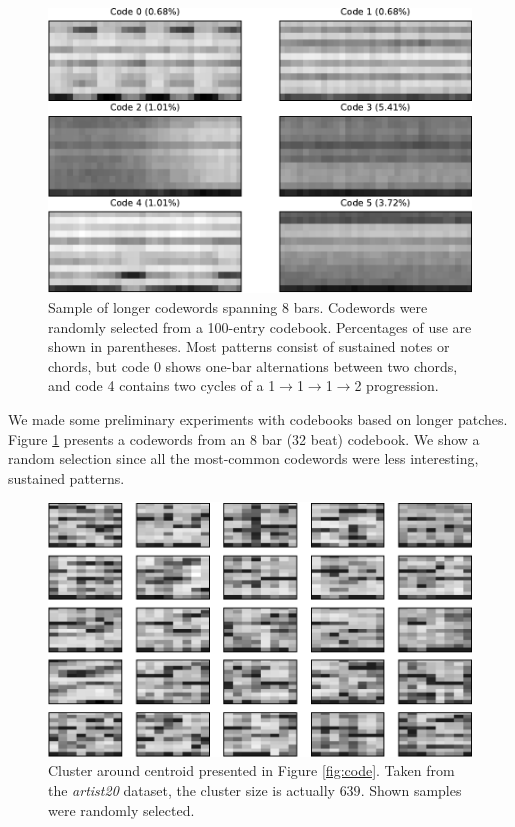 \documentclass{article}
\begin{document}
\begin{figure}[htb]
\begin{center}
\includegraphics[width=.8\columnwidth]{codes_8bars}
\end{center}
\caption{\small{Sample of longer codewords spanning $8$
    bars. Codewords were randomly selected from a 100-entry 
    codebook. Percentages of use are shown in parentheses.  Most patterns
    consist of sustained notes or chords, but code 0 shows one-bar 
    alternations between two chords, and code 4 contains two cycles of a
    1$\rightarrow$1$\rightarrow$1$\rightarrow$2 progression.}}
\label{fig:codes8bars}
\end{figure}

We made some preliminary experiments with codebooks based on 
longer patches.  Figure \ref{fig:codes8bars} presents a codewords 
from an 8 bar (32 beat) codebook.  We show a random selection 
since all the most-common codewords were less interesting, sustained 
patterns.


\begin{figure}[htb]
\begin{center}
\includegraphics[width=.9\columnwidth]{close_patterns1}
\end{center}
\caption{\small{Cluster around centroid presented in
Figure \ref{fig:code}. Taken from the {\it artist20} dataset, the cluster
size is actually $639$. Shown samples were randomly selected.
}}
\label{fig:cluster}
\end{figure}
\end{document}
